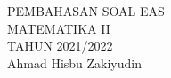 \documentclass{article}
\begin{document}
 \begin{titlepage}
    \vspace*{\fill}  
    \begin{center}
      \Huge {PEMBAHASAN SOAL EAS \\ MATEMATIKA II \\ TAHUN 2021/2022}\\[0.4 cm]
      \huge {Ahmad Hisbu Zakiyudin}
    \end{center}
    \vspace*{\fill}
  \end{titlepage}
\makeatletter
\renewcommand*\env@matrix[1][*\c@MaxMatrixCols c]{%
  \hskip -\arraycolsep
  \let\@ifnextchar\new@ifnextchar
  \array{#1}}
\makeatother
\newcount\arrowcount
\newcommand\arrows[1]{
        \global\arrowcount#1
        \ifnum\arrowcount>0
                \begin{matrix}[c]
                \expandafter\nextarrow
        \fi
}

\newcommand\nextarrow[1]{
        \global\advance\arrowcount-1
        \ifx\relax#1\relax\else \xrightarrow{#1}\fi
        \ifnum\arrowcount=0
                \end{matrix}
        \else
                \\
                \expandafter\nextarrow
        \fi
}
\newpage
{}
\end{document}
